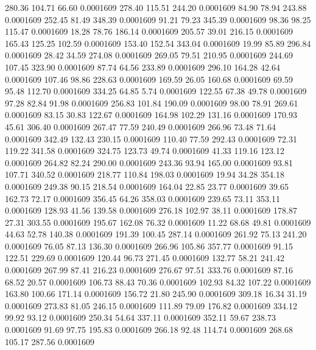  280.36  104.71   66.60   0.0001609
 278.40  115.51  244.20   0.0001609
  84.90   78.94  243.88   0.0001609
 252.45   81.49  348.39   0.0001609
  91.21   79.23  345.39   0.0001609
  98.36   98.25  115.47   0.0001609
  18.28   78.76  186.14   0.0001609
 205.57   39.01  216.15   0.0001609
 165.43  125.25  102.59   0.0001609
 153.40  152.54  343.04   0.0001609
  19.99   85.89  296.84   0.0001609
  28.42   34.59  274.08   0.0001609
 269.05   79.51  210.95   0.0001609
 244.69  107.45  323.90   0.0001609
  87.74   64.56  233.89   0.0001609
 296.10  164.28   42.64   0.0001609
 107.46   98.86  228.63   0.0001609
 169.59   26.05  160.68   0.0001609
  69.59   95.48  112.70   0.0001609
 334.25   64.85    5.74   0.0001609
 122.55   67.38   49.78   0.0001609
  97.28   82.84   91.98   0.0001609
 256.83  101.84  190.09   0.0001609
  98.00   78.91  269.61   0.0001609
  83.15   30.83  122.67   0.0001609
 164.98  102.29  131.16   0.0001609
 170.93   45.61  306.40   0.0001609
 267.47   77.59  240.49   0.0001609
 266.96   73.48   71.64   0.0001609
 342.49  132.43  230.15   0.0001609
 110.40   77.59  292.43   0.0001609
  72.31  119.22  341.58   0.0001609
 324.75  123.73   49.74   0.0001609
  41.33  119.16  123.12   0.0001609
 264.82   82.24  290.00   0.0001609
 243.36   93.94  165.00   0.0001609
  93.81  107.71  340.52   0.0001609
 218.77  110.84  198.03   0.0001609
  19.94   34.28  354.18   0.0001609
 249.38   90.15  218.54   0.0001609
 164.04   22.85   23.77   0.0001609
  39.65  162.73   72.17   0.0001609
 356.45   64.26  358.03   0.0001609
 239.65   73.11  353.11   0.0001609
 128.93   41.56  139.58   0.0001609
 276.18  102.97   38.11   0.0001609
 178.87   27.31  303.55   0.0001609
 195.67  162.08   76.32   0.0001609
  11.22   68.68   49.81   0.0001609
  44.63   52.78  140.38   0.0001609
 191.39  100.45  287.14   0.0001609
 261.92   75.13  241.20   0.0001609
  76.05   87.13  136.30   0.0001609
 266.96  105.86  357.77   0.0001609
  91.15  122.51  229.69   0.0001609
 120.44   96.73  271.45   0.0001609
 132.77   58.21  241.42   0.0001609
 267.99   87.41  216.23   0.0001609
 276.67   97.51  333.76   0.0001609
  87.16   68.52   20.57   0.0001609
 106.73   88.43   70.36   0.0001609
 102.93   84.32  107.22   0.0001609
 163.80  100.66  171.14   0.0001609
 156.72   21.80  245.90   0.0001609
 309.18   16.34   31.19   0.0001609
 273.83   81.05  246.15   0.0001609
 111.89   79.09  176.82   0.0001609
 334.12   99.92   93.12   0.0001609
 250.34   54.64  337.11   0.0001609
 352.11   59.67  238.73   0.0001609
  91.69   97.75  195.83   0.0001609
 266.18   92.48  114.74   0.0001609
 268.68  105.17  287.56   0.0001609
